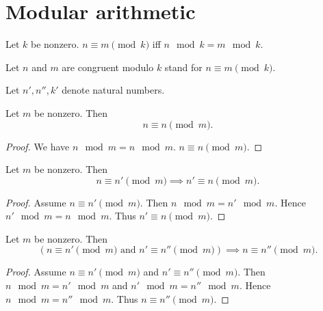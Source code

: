 \documentclass[../../natural-numbers.ftl.tex]{subfiles}
\begin{document}


  \section{Modular arithmetic}

  \begin{forthel}
    \begin{definition}
      Let $k$ be nonzero.
      $n \equiv m \pmod{k}$ iff $n \mod k = m \mod k$.
    \end{definition}

    Let $n$ and $m$ are congruent modulo $k$ stand for $n \equiv m \pmod{k}$.

    Let $n',n'',k'$ denote natural numbers.

    \begin{proposition}[NN 03 03 188421]
      Let $m$ be nonzero.
      Then \[ n \equiv n \pmod{m}. \]
    \end{proposition}
    \begin{proof}
      We have $n \mod m = n \mod m$.
      $n \equiv n \pmod{m}$.
    \end{proof}

    \begin{proposition}[NN 03 03 880545]
      Let $m$ be nonzero.
      Then \[ n \equiv n' \pmod{m} \implies n' \equiv n \pmod{m}. \]
    \end{proposition}
    \begin{proof}
      Assume $n \equiv n' \pmod{m}$.
      Then $n \mod m = n' \mod m$.
      Hence $n' \mod m = n \mod m$.
      Thus $n' \equiv n \pmod{m}$.
    \end{proof}

    \begin{proposition}[NN 03 03 310316]
      Let $m$ be nonzero.
      Then \[ (\text{$n \equiv n' \pmod{m}$ and $n' \equiv n'' \pmod{m}$}) \implies n \equiv n'' \pmod{m}. \]
    \end{proposition}
    \begin{proof}
      Assume $n \equiv n' \pmod{m}$ and $n' \equiv n'' \pmod{m}$.
      Then $n \mod m = n' \mod m$ and $n' \mod m = n'' \mod m$.
      Hence $n \mod m = n'' \mod m$.
      Thus $n \equiv n'' \pmod{m}$.
    \end{proof}


\end{forthel}
\end{document}
